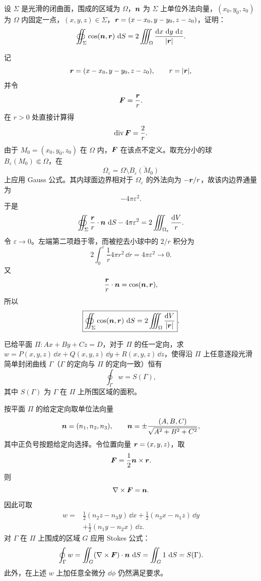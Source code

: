 \begin{xreferenceproblem}[4]
设 $\Sigma$ 是光滑的闭曲面，围成的区域为 $\Omega$，$\bm{n}$ 为 $\Sigma$ 上单位外法向量，$(x_0,y_0,z_0)$ 为 $\Omega$ 内固定一点，$(x,y,z)\in\Sigma$，$\bm{r}=(x-x_0,y-y_0,z-z_0)$，证明：
\[
  \oiint_\Sigma\cos(\bm{n},\bm{r})\,\mathop{}\!\mathrm{d} S
  =2\iiint_\Omega\frac{\mathop{}\!\mathrm{d} x\,\mathop{}\!\mathrm{d} y\,\mathop{}\!\mathrm{d} z}{|\bm{r}|}.
\]
\end{xreferenceproblem}
\begin{xsolution}
记
\[
  \bm{r}=(x-x_0,y-y_0,z-z_0),
  \qquad r=|\bm{r}|,
\]
并令
\[
  \bm{F}=\frac{\bm{r}}{r}.
\]
在 $r>0$ 处直接计算得
\[
  \operatorname{div}\bm{F}=\frac2r.
\]
由于 $M_0=(x_0,y_0,z_0)$ 在 $\Omega$ 内，$\bm{F}$ 在该点不定义。取充分小的球 $B_\varepsilon(M_0)\Subset\Omega$，在
\[
  \Omega_\varepsilon=\Omega\setminus\overline{B_\varepsilon(M_0)}
\]
上应用 Gauss 公式。其内球面边界相对于 $\Omega_\varepsilon$ 的外法向为 $-\bm{r}/r$，故该内边界通量为
\[
  -4\pi\varepsilon^2.
\]
于是
\[
  \oiint_\Sigma\frac{\bm{r}}{r}\cdot\bm{n}\,\mathop{}\!\mathrm{d} S-4\pi\varepsilon^2
  =2\iiint_{\Omega_\varepsilon}\frac{\mathop{}\!\mathrm{d} V}{r}.
\]
令 $\varepsilon\to0$。左端第二项趋于零，而被挖去小球中的 $2/r$ 积分为
\[
  2\int_0^\varepsilon\frac1r4\pi r^2\,\dd r=4\pi\varepsilon^2\to0.
\]
又
\[
  \frac{\bm{r}}{r}\cdot\bm{n}=\cos(\bm{n},\bm{r}),
\]
所以
\[
  \boxed{\oiint_\Sigma\cos(\bm{n},\bm{r})\,\mathop{}\!\mathrm{d} S
  =2\iiint_\Omega\frac{\mathop{}\!\mathrm{d} V}{|\bm{r}|}}.
\]
\end{xsolution}


\begin{xreferenceproblem}[5]
已给平面 $\Pi:Ax+By+Cz=D$，对于 $\Pi$ 的任一定向，求 $w=P(x,y,z)\,\dd x+Q(x,y,z)\,\dd y+R(x,y,z)\,\dd z$，使得沿 $\Pi$ 上任意逐段光滑简单封闭曲线 $\Gamma$（$\Gamma$ 的定向与 $\Pi$ 的定向一致）恒有
\[
  \oint_\Gamma w=S(\Gamma),
\]
其中 $S(\Gamma)$ 为 $\Gamma$ 在 $\Pi$ 上所围区域的面积。
\end{xreferenceproblem}
\begin{xsolution}
按平面 $\Pi$ 的给定定向取单位法向量
\[
  \bm{n}=(n_1,n_2,n_3),
  \qquad
  \bm{n}=\pm\frac{(A,B,C)}{\sqrt{A^2+B^2+C^2}},
\]
其中正负号按题给定向选择。令位置向量 $\bm{r}=(x,y,z)$，取
\[
  \bm{F}=\frac12\bm{n}\times\bm{r}.
\]
则
\[
  \nabla\times\bm{F}=\bm{n}.
\]
因此可取
\[
\boxed{
\begin{aligned}
w={}&\frac12(n_2z-n_3y)\,\dd x
+\frac12(n_3x-n_1z)\,\dd y\\
&+\frac12(n_1y-n_2x)\,\dd z.
\end{aligned}}
\]
对 $\Gamma$ 在 $\Pi$ 上围成的区域 $G$ 应用 Stokes 公式：
\[
  \oint_\Gamma w
  =\iint_G(\nabla\times\bm{F})\cdot\bm{n}\,\mathop{}\!\mathrm{d} S
  =\iint_G1\,\mathop{}\!\mathrm{d} S=S(\Gamma).
\]
此外，在上述 $w$ 上加任意全微分 $\dd\phi$ 仍然满足要求。
\end{xsolution}


